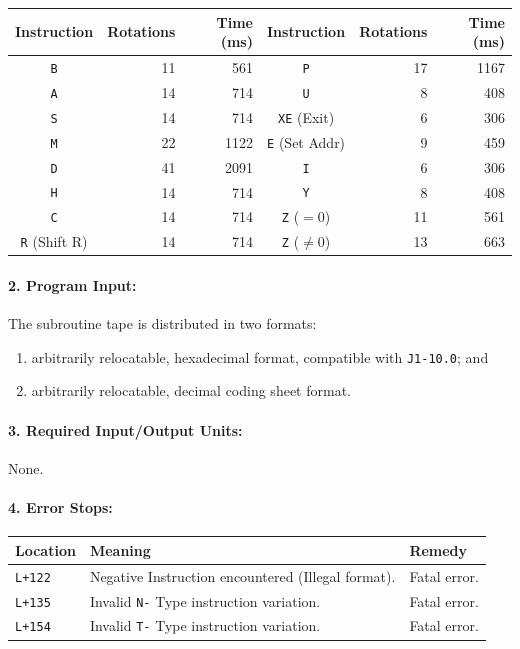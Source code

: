 \medskip
\noindent
\small
\begin{tabular}{crr|crr}
\toprule
\textbf{Instruction} & \textbf{Rotations} & \textbf{Time (ms)} & \textbf{Instruction} & \textbf{Rotations} & \textbf{Time (ms)} \\
\midrule
\texttt{B}           & 11 & 561  & \texttt{P}            & 17 & 1167 \\
\texttt{A}           & 14 & 714  & \texttt{U}            & 8  & 408  \\
\texttt{S}           & 14 & 714  & \texttt{XE} (Exit)    & 6  & 306  \\
\texttt{M}           & 22 & 1122 & \texttt{E} (Set Addr) & 9  & 459  \\
\texttt{D}           & 41 & 2091 & \texttt{I}            & 6  & 306  \\
\texttt{H}           & 14 & 714  & \texttt{Y}            & 8  & 408  \\
\texttt{C}           & 14 & 714  & \texttt{Z} ($=0$)     & 11 & 561  \\
\texttt{R} (Shift R) & 14 & 714  & \texttt{Z} ($\ne0$)   & 13 & 663  \\
\bottomrule
\end{tabular}
\normalsize

\paragraph{2. Program Input:}
The subroutine tape is distributed in two formats:
\begin{enumerate}[label=\alph*), itemsep=2pt, topsep=2pt]
    \item arbitrarily relocatable, hexadecimal format, compatible with \texttt{J1-10.0}; and
    \item arbitrarily relocatable, decimal coding sheet format.
\end{enumerate}

\paragraph{3. Required Input/Output Units:} None.

\paragraph{4. Error Stops:}
\begin{center}
\begin{tabular}{l p{6.5cm} l}
    \toprule
    \textbf{Location} & \textbf{Meaning} & \textbf{Remedy} \\
    \midrule
    \texttt{L+122}    & Negative Instruction encountered (Illegal format). & Fatal error. \\
    \texttt{L+135}    & Invalid \texttt{N-} Type instruction variation.    & Fatal error. \\
    \texttt{L+154}    & Invalid \texttt{T-} Type instruction variation.    & Fatal error. \\
    \bottomrule
\end{tabular}
\end{center}


